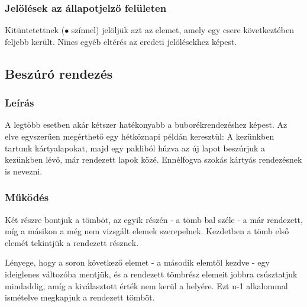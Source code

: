 \documentclass{elteikthesis}
\begin{document}
\subsubsection{Jelölések az állapotjelző felületen}
Kitüntetettnek (\textcolor{select}{\Huge$\bullet$} színnel) jelöljük azt az elemet, amely egy csere következtében feljebb került. Nincs egyéb eltérés az eredeti jelölésekhez képest.

\subsection{Beszúró rendezés}
\subsubsection{Leírás}
 A legtöbb esetben akár kétszer hatékonyabb a buborékrendezéshez képest\cite{Fekete}. Az elve egyszerűen megérthető egy hétköznapi példán keresztül: A kezünkben tartunk kártyalapokat, majd egy pakliból húzva az új lapot beszúrjuk a kezünkben lévő, már rendezett lapok közé. Ennélfogva szokás kártyás rendezésnek is nevezni.
\subsubsection{Működés}
Két részre bontjuk a tömböt, az egyik részén - a tömb bal széle - a már rendezett, míg a másikon a még nem vizsgált elemek szerepelnek. Kezdetben a tömb első elemét tekintjük a rendezett résznek.\par
Lényege, hogy a soron következő elemet - a második elemtől kezdve - egy ideiglenes változóba mentjük, és a rendezett tömbrész elemeit jobbra csúsztatjuk mindaddig, amíg a kiválasztott érték nem kerül a helyére. Ezt n-1 alkalommal ismételve megkapjuk a rendezett tömböt.
\end{document}
